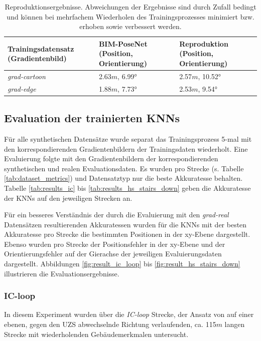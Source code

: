 \begin{table}[b]
	\centering
	\caption{Reproduktionsergebnisse. Abweichungen der Ergebnisse sind durch Zufall bedingt und können bei mehrfachem Wiederholen des Trainingsprozesses minimiert bzw. erhoben sowie verbessert werden. }
	\begin{tabularx}{1.0\textwidth}{X X X}
		\textbf{Trainingsdatensatz} \hspace{2cm} (Gradientenbild) & \textbf{BIM-PoseNet} \hspace{2cm} (Position, Orientierung) & \textbf{Reproduktion} \hspace{2cm} (Position, Orientierung)\\
		\hline
	 \textit{grad-cartoon} & 2.63$m$, 6.99° & 2.57$m$, 10.52°\\
		\hline
		\textit{grad-edge} & 1.88$m$, 7.73°  & 2.53$m$, 9.54°\\
	\end{tabularx}
	\label{tab:reproduction}
\end{table}





\subsection{Evaluation der trainierten KNNs}
Für alle synthetischen Datensätze wurde separat das Trainingsprozess 5-mal mit den korrespondierenden Gradientenbildern der Trainingsdaten wiederholt. Eine Evaluierung folgte mit den Gradientenbildern der korrespondierenden synthetischen und realen Evaluationsdaten. Es wurden pro Strecke (s. Tabelle \ref{tab:dataset_metrics}) und Datensatztyp nur die beste Akkuratesse behalten. Tabelle \ref{tab:results_ic} bis \ref{tab:results_hs_stairs_down} geben die Akkuratesse der KNNs auf den jeweiligen Strecken an. 

Für ein besseres Verständnis der durch die Evaluierung mit den \textit{grad-real} Datensätzen resultierenden Akkuratessen wurden für die KNNs mit der besten Akkuratesse pro Strecke die bestimmten Positionen in der xy-Ebene dargestellt. Ebenso wurden pro Strecke der Positionsfehler in der xy-Ebene und der Orientierungsfehler auf der Gierachse der jeweiligen Evaluierungsdaten dargestellt. Abbildungen \ref{fig:result_ic_loop} bis \ref{fig:result_hs_stairs_down} illustrieren die Evaluationsergebnisse.


\subsubsection{IC-loop}
In diesem Experiment wurden über die \textit{IC-loop} Strecke, der Ansatz von \citet{acharyaBIMPoseNetIndoorCamera2019} auf einer ebenen, gegen den UZS abwechselnde Richtung verlaufenden, ca. 115$m$ langen Strecke mit wiederholenden Gebäudemerkmalen untersucht. 

